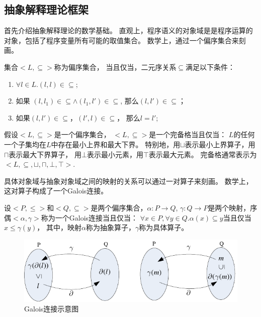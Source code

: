 \subsection{抽象解释理论框架}

首先介绍抽象解释理论的数学基础。
直观上，程序语义的对象域是是程序运算的对象，包括了程序变量所有可能的取值集合。
数学上，通过一个偏序集合来刻画。

\begin{definition}
集合$<L, \subseteq>$称为偏序集合，
当且仅当，二元序关系$\subseteq$满足以下条件：
\begin{enumerate}
\item $\forall l \in L. (l,l)\in \subseteq$;
\item 如果 $(l,l_1)\in \subseteq \wedge (l_1, l')\in \subseteq$,
	那么$(l,l')\in \subseteq$；
\item 如果$(l,l')\in \subseteq$，$(l',l)\in \subseteq$，
	那么$l = l'$;
\end{enumerate}
\end{definition}


\begin{definition}
假设$<L, \subseteq>$是一个偏序集合，
$<L, \subseteq>$是一个完备格当且仅当：
$L$的任何一个子集均在$L$中存在最小上界和最大下界。
特别地，用$\sqcup$表示最小上界算子，用$\sqcap$表示最大下界算子，
用$\bot$表示最小元素，用$\top$表示最大元素。
完备格通常表示为$<L, \subseteq, \sqcup, \sqcap, \bot, \top>$.
\end{definition}


具体对象域与抽象对象域之间的映射的关系可以通过一对算子来刻画。
数学上，这对算子构成了一个Galois连接。


\begin{definition}
设$<P, \leq>$和$<Q, \subseteq>$是两个偏序集合，$\alpha:P \rightarrow Q$,
$\gamma: Q \rightarrow P$是两个映射，序偶$<\alpha, \gamma>$称为一个Galois连接当且仅当：
$\forall x\in P, \forall y\in Q. \alpha(x) \subseteq y$当且仅当$x\leq \gamma(y)$，
其中，映射$\alpha$称为抽象算子，$\gamma$称为具体算子。
\end{definition}

\begin{figure}[h]
\centering
\includegraphics{figures/chap04/galois.pdf}
\caption{Galois连接示意图}
\label{fig-galois}
\end{figure}

